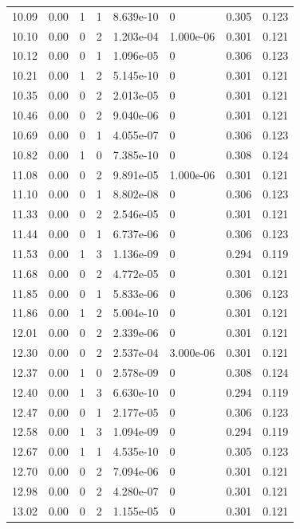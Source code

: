 \documentclass[preview]{standalone}
\begin{document}
{{{\begin{tabular}{L{1.2cm}C{1.2cm} C{0.3cm}C{0.5cm} C{1.4cm}C{1.4cm} C{1.4cm}C{1.4cm}}
  10.09  &  0.00  & 1     &  1 &  8.639e-10  & 0  & 0.305 &  0.123   \\ 
  10.10  &  0.00  & 0     &  2 &  1.203e-04  & 1.000e-06  & 0.301 &  0.121   \\ 
  10.12  &  0.00  & 0     &  1 &  1.096e-05  & 0  & 0.306 &  0.123   \\ 
  10.21  &  0.00  & 1     &  2 &  5.145e-10  & 0  & 0.301 &  0.121   \\ 
  10.35  &  0.00  & 0     &  2 &  2.013e-05  & 0  & 0.301 &  0.121   \\ 
  10.46  &  0.00  & 0     &  2 &  9.040e-06  & 0  & 0.301 &  0.121   \\ 
  10.69  &  0.00  & 0     &  1 &  4.055e-07  & 0  & 0.306 &  0.123   \\ 
  10.82  &  0.00  & 1     &  0 &  7.385e-10  & 0  & 0.308 &  0.124   \\ 
  11.08  &  0.00  & 0     &  2 &  9.891e-05  & 1.000e-06  & 0.301 &  0.121   \\ 
  11.10  &  0.00  & 0     &  1 &  8.802e-08  & 0  & 0.306 &  0.123   \\ 
  11.33  &  0.00  & 0     &  2 &  2.546e-05  & 0  & 0.301 &  0.121   \\ 
  11.44  &  0.00  & 0     &  1 &  6.737e-06  & 0  & 0.306 &  0.123   \\ 
  11.53  &  0.00  & 1     &  3 &  1.136e-09  & 0  & 0.294 &  0.119   \\ 
  11.68  &  0.00  & 0     &  2 &  4.772e-05  & 0  & 0.301 &  0.121   \\ 
  11.85  &  0.00  & 0     &  1 &  5.833e-06  & 0  & 0.306 &  0.123   \\ 
  11.86  &  0.00  & 1     &  2 &  5.004e-10  & 0  & 0.301 &  0.121   \\ 
  12.01  &  0.00  & 0     &  2 &  2.339e-06  & 0  & 0.301 &  0.121   \\ 
  12.30  &  0.00  & 0     &  2 &  2.537e-04  & 3.000e-06  & 0.301 &  0.121   \\ 
  12.37  &  0.00  & 1     &  0 &  2.578e-09  & 0  & 0.308 &  0.124   \\ 
  12.40  &  0.00  & 1     &  3 &  6.630e-10  & 0  & 0.294 &  0.119   \\ 
  12.47  &  0.00  & 0     &  1 &  2.177e-05  & 0  & 0.306 &  0.123   \\ 
  12.58  &  0.00  & 1     &  3 &  1.094e-09  & 0  & 0.294 &  0.119   \\ 
  12.67  &  0.00  & 1     &  1 &  4.535e-10  & 0  & 0.305 &  0.123   \\ 
  12.70  &  0.00  & 0     &  2 &  7.094e-06  & 0  & 0.301 &  0.121   \\ 
  12.98  &  0.00  & 0     &  2 &  4.280e-07  & 0  & 0.301 &  0.121   \\ 
  13.02  &  0.00  & 0     &  2 &  1.155e-05  & 0  & 0.301 &  0.121   \\ 
\hline 
\end{tabular} 

}}}
\end{document}
